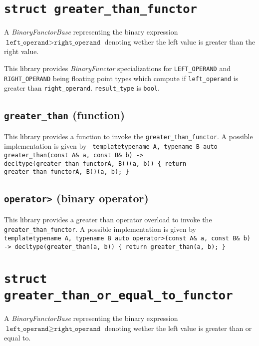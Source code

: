 \documentclass[oneside]{book}
\begin{document}
\section{\texttt{struct greater\_than\_functor}}
A \textit{BinaryFunctorBase} representing the binary expression
$\texttt{left\_operand} > \texttt{right\_operand}$
denoting wether the left value is greater than the right value.\newline

\noindent{}This library provides \textit{BinaryFunctor}         specializations for
\texttt{LEFT\_OPERAND} and   \texttt{RIGHT\_OPERAND} being     floating point types
which compute if \texttt{left\_operand}    is greater than \texttt{right\_operand}.
\texttt{result\_type} is \texttt{bool}.

\subsection{\texttt{greater\_than} (function)}
This library provides a function to invoke the \texttt{greater\_than\_functor}.
A possible implementation is given by\newline
\texttt{
template\textlangle typename A, typename B\textrangle\newline
auto greater\_than(const A\& a, const B\& b)\newline
-> decltype(greater\_than\_functor\textlangle A, B\textrangle()(a, b))\newline
\{ return greater\_than\_functor\textlangle A, B\textrangle()(a, b); \}
}

\subsection{\texttt{operator>} (binary operator)}
This library provides a greater than operator overload to invoke the \texttt{greater\_than\_functor}.
A possible implementation is given by\newline
\texttt{
template\textlangle typename A, typename B\textrangle\newline
auto operator>(const A\& a, const B\& b)\newline
-> decltype(greater\_than(a, b))\newline
\{ return greater\_than(a, b); \}
}

\section{\texttt{struct greater\_than\_or\_equal\_to\_functor}}
A \textit{BinaryFunctorBase} representing the binary expression
$\texttt{left\_operand} \geq \texttt{right\_operand}$
denoting wether the left value is greater than or equal to.\newline
\end{document}
